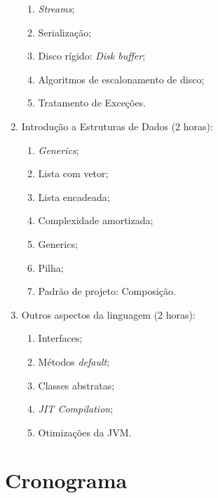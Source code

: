 \documentclass{article}
\begin{document}
\begin{enumerate}
\begin{samepage}
            \begin{enumerate}
                \item \textit{Streams};
                \item Serialização;
                \item Disco rígido: \textit{Disk buffer};
                \item Algoritmos de escalonamento de disco;
                \item Tratamento de Exceções.
            \end{enumerate}
        \end{samepage}
    \item Introdução a Estruturas de Dados (2 horas):
        \begin{samepage}
            \begin{enumerate}
                \item \textit{Generics};
                \item Lista com vetor;
                \item Lista encadeada;
                \item Complexidade amortizada;
                \item Generics;
                \item Pilha;
                \item Padrão de projeto: Composição.
            \end{enumerate}
        \end{samepage}
    \item Outros aspectos da linguagem (2 horas):
        \begin{samepage}
            \begin{enumerate}
                \item Interfaces;
                \item Métodos \textit{default};
                \item Classes abstratas;
                \item \textit{JIT Compilation};
                \item Otimizações da JVM\@.
            \end{enumerate}
        \end{samepage}
\end{enumerate}

\section{Cronograma}
\end{document}
